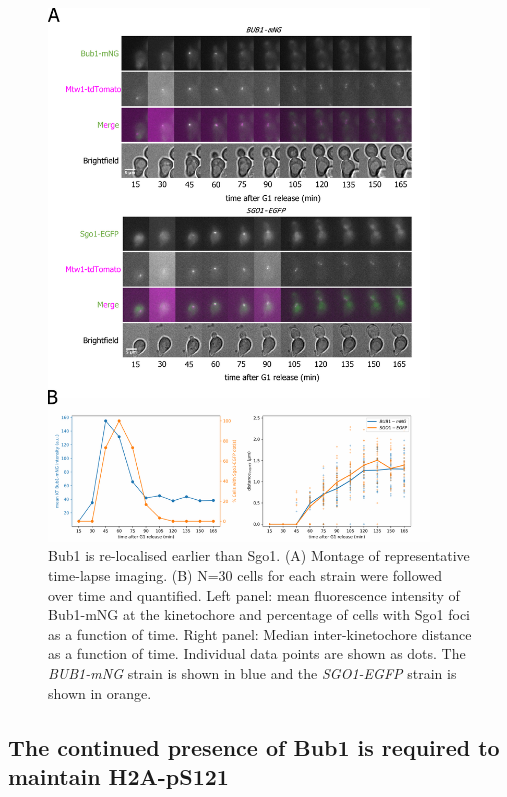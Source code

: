 \begin{figure}[htbp]
  \centering
  \includegraphics[width=0.9\textwidth]{chapter3/figures/Bub1-mNG Sgo1-EGFP.pdf}
  \caption[Bub1 is de-localised earlier than Sgo1]{Bub1 is re-localised earlier than Sgo1. (A) Montage of representative time-lapse imaging. (B) N=30 cells for each strain were followed over time and quantified. Left panel: mean fluorescence intensity of Bub1-mNG at the kinetochore and percentage of cells with Sgo1 foci as a function of time. Right panel: Median inter-kinetochore distance as a function of time. Individual data points are shown as dots. The \textit{BUB1-mNG} strain is shown in blue and the \textit{SGO1-EGFP} strain is shown in orange.}
  \label{fig:bub1sgo1}
\end{figure} 

\subsection{The continued presence of Bub1 is required to maintain H2A-pS121}

